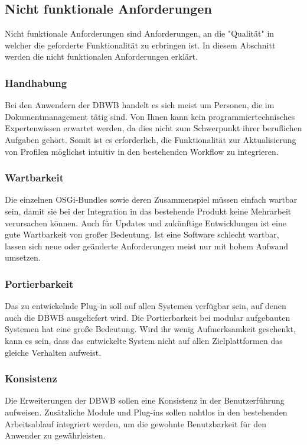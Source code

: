 {{}
\subsection{Nicht funktionale Anforderungen}{
Nicht funktionale Anforderungen sind Anforderungen, an die "Qualität" in welcher die geforderte Funktionalität zu erbringen ist. In diesem Abschnitt werden die nicht funktionalen Anforderungen erklärt.

\subsubsection{Handhabung}{
Bei den Anwendern der \ac{DBWB} handelt es sich meist um Personen, die im Dokumentmanagement tätig sind. Von Ihnen kann kein programmiertechnisches Expertenwissen erwartet werden, da dies nicht zum Schwerpunkt ihrer beruflichen Aufgaben gehört. Somit ist es erforderlich, die Funktionalität zur Aktualisierung von Profilen möglichst intuitiv in den bestehenden Workflow zu integrieren.
}
\subsubsection{Wartbarkeit}{
Die einzelnen \ac{OSGi}-Bundles sowie deren Zusammenspiel müssen einfach wartbar
sein, damit sie bei der Integration in das bestehende Produkt keine Mehrarbeit verursachen können. Auch für Updates und zukünftige Entwicklungen ist eine gute Wartbarkeit von großer Bedeutung. Ist eine Software schlecht wartbar, lassen sich neue oder geänderte Anforderungen meist nur mit hohem Aufwand umsetzen.
}
\subsubsection{Portierbarkeit}{
Das zu entwickelnde Plug-in soll auf allen Systemen verfügbar sein, auf denen auch die \ac{DBWB} ausgeliefert wird. Die Portierbarkeit bei modular aufgebauten Systemen hat eine große Bedeutung. Wird ihr wenig Aufmerksamkeit geschenkt, kann es sein, dass das entwickelte System nicht auf allen Zielplattformen das gleiche Verhalten aufweist.
}

\subsubsection{Konsistenz}{
Die Erweiterungen der \ac{DBWB} sollen eine Konsistenz in der Benutzerführung aufweisen. Zusätzliche Module und Plug-ins sollen nahtlos in den bestehenden Arbeitsablauf integriert werden, um die gewohnte Benutzbarkeit für den Anwender zu gewährleisten.
}


}

}

